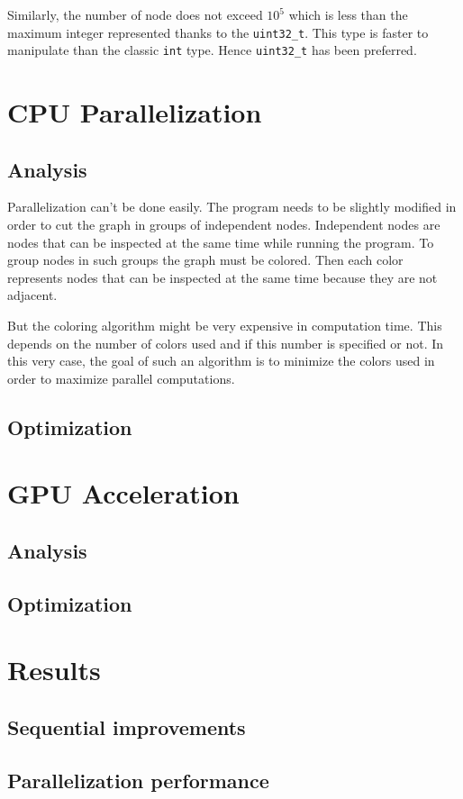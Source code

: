 \documentclass[fleqn,11pt]{SelfArx} %
\begin{document}
Similarly, the number of node does not exceed $10^5$ which is less than the maximum integer represented thanks to the \verb+uint32_t+. This type is faster to manipulate than the classic \verb+int+ type. Hence \verb+uint32_t+ has been preferred.

\section{CPU Parallelization}

\subsection{Analysis}

Parallelization can't be done easily. The program needs to be slightly modified in order to cut the graph in groups of independent nodes. Independent nodes are nodes that can be inspected at the same time while running the program. To group nodes in such groups the graph must be colored. Then each color represents nodes that can be inspected at the same time because they are not adjacent.

But the coloring algorithm might be very expensive in computation time. This depends on the number of colors used and if this number is specified or not. In this very case, the goal of such an algorithm is to minimize the colors used in order to maximize parallel computations.

\subsection{Optimization}

\section{GPU Acceleration}

\subsection{Analysis}

\subsection{Optimization}

\section{Results}

\subsection{Sequential improvements}

\subsection{Parallelization performance}
\end{document}
